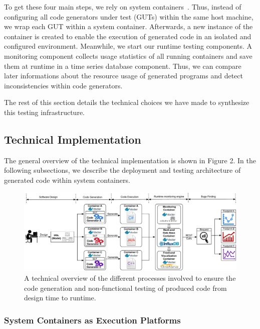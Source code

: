 To get these four main steps, we rely on system containers~\cite{soltesz2007container}. Thus, instead of configuring all code generators under test (GUTs) within the same host machine, we wrap each GUT within a system container. Afterwards, a new instance of the container is created to enable the execution of generated code in an isolated and configured environment. Meanwhile, we start our runtime testing components. A monitoring component collects usage statistics of all running containers and save them at runtime in a time series database component. Thus, we can compare later informations about the resource usage of generated programs and detect inconsistencies within code generators.


The rest of this section details the technical choices we have made to synthesize this testing infrastructure.

\subsection{Technical Implementation}

The general overview of the technical implementation is shown in Figure 2. In the following subsections, we describe the deployment and testing architecture of generated code within system containers.


\begin{figure}[!h]
	\includegraphics[width=1\linewidth]{Ressources/background2.pdf}
	\caption{A technical overview of the different processes involved to ensure the code generation and non-functional testing of produced code from design time to runtime.}
\end{figure}


\subsubsection{System Containers as Execution Platforms}



